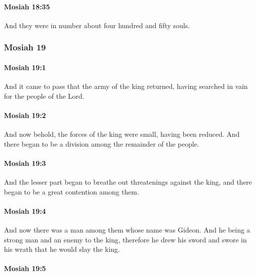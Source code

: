 		\paragraph{Mosiah 18:35} %
			\label{MOSIAH-18-35}

			And they were in number about four hundred and fifty souls.
			
	\subsubsection{Mosiah 19} %
		\label{MOSIAH-19}
		
		\paragraph{Mosiah 19:1} %
			\label{MOSIAH-19-1}

			And it came to pass that the army of the king returned,
			having searched in vain for the people of the Lord.

		\paragraph{Mosiah 19:2} %
			\label{MOSIAH-19-2}

			And now behold, the forces of the king were small, having been reduced.
			And there began to be a division among the remainder of the people.

		\paragraph{Mosiah 19:3} %
			\label{MOSIAH-19-3}

			And the lesser part began to breathe out threatenings against the king,
			and there began to be a great contention among them.

		\paragraph{Mosiah 19:4} %
			\label{MOSIAH-19-4}

			And now there was a man among them whose name was Gideon.
			And he being a strong man and an enemy to the king,
			therefore he drew his sword and swore in his wrath
			that he would slay the king.

		\paragraph{Mosiah 19:5} %
			\label{MOSIAH-19-5}

